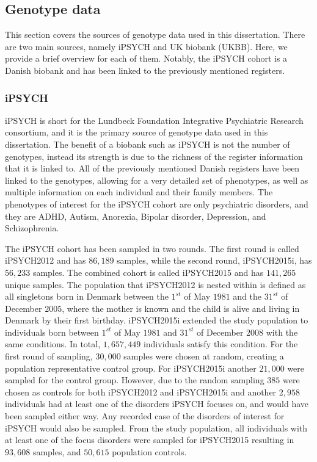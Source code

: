 \subsection{Genotype data}
This section covers the sources of genotype data used in this dissertation. There are two main sources, namely iPSYCH and UK biobank (UKBB). Here, we provide a brief overview for each of them. Notably, the iPSYCH cohort is a Danish biobank and has been linked to the previously mentioned registers. 


\subsubsection{iPSYCH}
iPSYCH is short for the Lundbeck Foundation Integrative Psychiatric Research consortium, and it is the primary source of genotype data used in this dissertation. The benefit of a biobank such as iPSYCH is not the number of genotypes, instead its strength is due to the richness of the register information that it is linked to. All of the previously mentioned Danish registers have been linked to the genotypes, allowing for a very detailed set of phenotypes, as well as multiple information on each individual and their family members. The phenotypes of interest for the iPSYCH cohort are only psychiatric disorders, and they are ADHD, Autism, Anorexia, Bipolar disorder, Depression, and Schizophrenia\cite{pedersen2018ipsych2012}.

The iPSYCH cohort has been sampled in two rounds. The first round is called iPSYCH2012 and has $ 86,189 $ samples, while the second round, iPSYCH2015i, has $ 56,233 $ samples. The combined cohort is called iPSYCH2015 and has $ 141,265 $ unique samples. The population that iPSYCH2012 is nested within is defined as all singletons born in Denmark between the $ 1^{st} $ of May $ 1981 $ and the $ 31^{st} $ of December $ 2005 $, where the mother is known and the child is alive and living in Denmark by their first birthday. iPSYCH2015i extended the study population to individuals born between $ 1^{st} $ of May $ 1981 $ and $ 31^{st} $ of December $ 2008 $ with the same conditions. In total, $ 1,657,449 $ individuals satisfy this condition. For the first round of sampling, $ 30,000 $ samples were chosen at random, creating a population representative control group. For iPSYCH2015i another $ 21,000 $ were sampled for the control group. However, due to the random sampling $ 385 $ were chosen as controls for both iPSYCH2012 and iPSYCH2015i and another $ 2,958 $ individuals had at least one of the disorders iPSYCH focuses on, and would have been sampled either way. Any recorded case of the disorders of interest for iPSYCH would also be sampled. From the study population, all individuals with at least one of the focus disorders were sampled for iPSYCH2015 resulting in $ 93,608 $ samples, and $ 50,615 $ population controls\cite{pedersen2018ipsych2012,bybjerg2020ipsych2015}.

